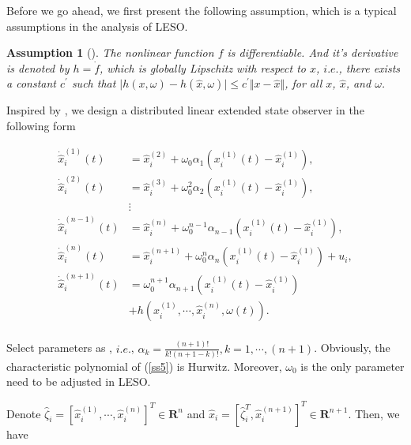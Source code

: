 \documentclass[english]{cccconf}
\newtheorem{assumption}{Assumption}
\begin{document}
  










Before we go ahead, we first present the following assumption, which is a typical assumptions in the analysis of LESO.

\begin{assumption}[\cite{Zheng2008}]\label{a2}
The nonlinear function $f$ is differentiable. And it's derivative is denoted by $h=\dot f$, which is globally Lipschitz with respect to $x$, $i.e.$, there exists a constant $c^{'}$ such that $\vert h(x,\omega) - h(\hat {x}, \omega) \vert \le c^{'} \Vert x - \hat x \Vert$, for all $x$, $\hat x$, and $\omega$.
\end{assumption}

Inspired by \cite{Zheng2008}, we design a distributed linear extended state observer in the following form

 \begin{equation}
  \label{ss5}
  \begin{aligned}
  {{\dot {\hat {x}}}}_i^{(1)} (t) &= {{\hat {x}}}_i^{(2)} + \omega_0 \alpha_1 (x_i^{(1)}(t) - {{\hat {x}}}_i^{(1)}),\\
  {{\dot {\hat {x}}}}_i^{(2)} (t) &= {{\hat {x}}}_i^{(3)} + \omega_0^{2} \alpha_2 (x_i^{(1)}(t) - {{\hat {x}}}_i^{(1)}),\\
  & \vdots \\
  {{\dot {\hat {x}}}}_i^{(n-1)} (t) &= {{\hat {x}}}_i^{(n)} + \omega_0^{n-1} \alpha_{n-1} (x_i^{(1)}(t) - {{\hat {x}}}_i^{(1)}),\\
  {{\dot {\hat {x}}}}_i^{(n)} (t) &= {{\hat {x}}}_i^{(n+1)} + \omega_0^{n} \alpha_n (x_i^{(1)}(t) - {{\hat {x}}}_i^{(1)})+u_i,\\
  {{\dot {\hat {x}}}}_i^{(n+1)}(t) &=\omega_0^{n+1} \alpha_{n+1} (x_i^{(1)}(t) - {{\hat {x}}}_i^{(1)}) \\ &+ h(\hat x_i^{(1)},\cdots,\hat x_i^{(n)},\omega(t)).\\
  \end{aligned}
\end{equation}

Select parameters as \cite{Zheng2008}, $i.e.$, $\alpha_k=\frac{(n+1)!}{k!(n+1-k)!},k=1,\cdots,(n+1)$.
Obviously, the characteristic polynomial of (\ref{ss5}) is Hurwitz. Moreover, $\omega_0$ is the only parameter need to be adjusted in LESO.

Denote $\hat \zeta_i = \left[ \hat x_i^{(1)},\cdots,\hat x_i^{(n)} \right]^T \in \mathbf R^n$ and $\hat x_i=\left[\hat \zeta_i^{T},\hat x_i^{(n+1)} \right]^T \in \mathbf R^{n+1}$. Then, we have
\end{document}
